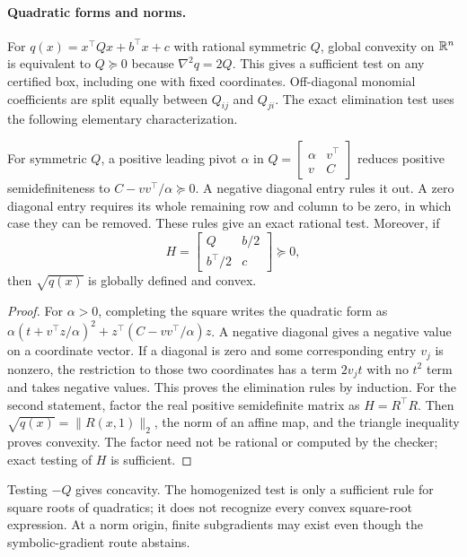 \paragraph{Quadratic forms and norms.}
For $q(x)=x^\top Qx+b^\top x+c$ with rational symmetric $Q$, global convexity on $\mathbb{R}^n$ is equivalent to $Q\succeq0$ because $\nabla^2q=2Q$. This gives a sufficient test on any certified box, including one with fixed coordinates. Off-diagonal monomial coefficients are split equally between $Q_{ij}$ and $Q_{ji}$. The exact elimination test uses the following elementary characterization.
\begin{lemma}
\label{lem:quadratic-recognition}
For symmetric $Q$, a positive leading pivot $\alpha$ in
$Q=\left[\begin{smallmatrix}\alpha&v^\top\\v&C\end{smallmatrix}\right]$
reduces positive semidefiniteness to $C-vv^\top/\alpha\succeq0$. A negative diagonal entry rules it out. A zero diagonal entry requires its whole remaining row and column to be zero, in which case they can be removed. These rules give an exact rational test. Moreover, if
\[
 H=\begin{bmatrix}Q&b/2\\b^\top/2&c\end{bmatrix}\succeq0,
\]
then $\sqrt{q(x)}$ is globally defined and convex.
\end{lemma}
\begin{proof}
For $\alpha>0$, completing the square writes the quadratic form as
$\alpha(t+v^\top z/\alpha)^2+z^\top(C-vv^\top/\alpha)z$.
A negative diagonal gives a negative value on a coordinate vector. If a diagonal is zero and some corresponding entry $v_j$ is nonzero, the restriction to those two coordinates has a term $2v_jt$ with no $t^2$ term and takes negative values. This proves the elimination rules by induction. For the second statement, factor the real positive semidefinite matrix as $H=R^\top R$. Then $\sqrt{q(x)}=\|R(x,1)\|_2$, the norm of an affine map, and the triangle inequality proves convexity. The factor need not be rational or computed by the checker; exact testing of $H$ is sufficient.
\end{proof}
Testing $-Q$ gives concavity. The homogenized test is only a sufficient rule for square roots of quadratics; it does not recognize every convex square-root expression. At a norm origin, finite subgradients may exist even though the symbolic-gradient route abstains.

